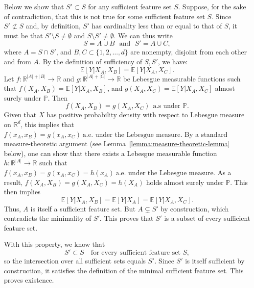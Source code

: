 \documentclass[sn-mathphys-num]{sn-jnl}%
\numberwithin{equation}{section}
\newcommand{\redblock}[1]{{\color{black}#1}}
\newcommand{\R}{\mathbb{R}}
\newcommand{\E}{\mathbb{E}}
\renewcommand{\P}{\mathbb{P}}
\theoremstyle{thmstyleone}%
\theoremstyle{thmstyletwo}%
\theoremstyle{thmstylethree}%
\begin{document}
Below we show that $S' \subset S$ for any sufficient feature set $S$. Suppose, for the sake of contradiction, that this is not true for some sufficient feature set $S$. Since $S' \not\subset S$ and, by definition, $S'$ has cardinality less than or equal to that of $S$, it must be that $S' \setminus S \neq \emptyset$ and $S \setminus S' \neq \emptyset$. We can thus write 
\begin{equation*}
	S = A \cup B~~~\text{and}~~~S' = A\cup C,
\end{equation*}
where $A = S \cap S'$, and $B, C \subset \{1, 2, \ldots, d\}$ are nonempty, disjoint from each other and from $A$.
By the definition of sufficiency of $S, S'$, we have:
\begin{equation*}
	\E[Y|X_A, X_B] =  \E[Y|X_A, X_C].
\end{equation*}
\redblock{
Let $f:\mathbb{R}^{|A|+|B|} \to \mathbb{R}$ and $g:\mathbb{R}^{|A|+|C|} \to \mathbb{R}$ be Lebesgue measurable functions such that
$f(X_A, X_B) = \E[Y | X_A, X_B]$, and 
$g(X_A, X_C) = \E[Y | X_A, X_C]$ almost surely under $\P$.  
Then 
\begin{equation*}
	f(X_A,X_B)=g(X_A,X_C)~~\text{a.s under $\P$}.
\end{equation*}
Given that $X$ has positive probability density with respect to Lebesgue measure on $\R^d$, this implies that 
$f(x_A, x_B) = g(x_A, x_C) ~\text{a.e. under the Lebesgue measure}$. 
By a standard measure-theoretic argument (see Lemma~\ref{lemma:measure-theoretic-lemma} below), one can show that
there exists a Lebesgue measurable function 
$h:\mathbb{R}^{|A|} \to \mathbb{R}$ such that 
$
f(x_A,x_B) = g(x_A,x_C) = h(x_A) ~\text{a.e. under the Lebesgue measure}.
$
As a result, $f(X_A, X_B) = g(X_A,X_C) = h(X_A)$ holds almost surely under $\P$. This then implies 
\begin{equation*}
	\E[Y|X_A, X_B] = \E[Y|X_A] = \E[Y|X_A, X_C].
\end{equation*}
Thus, $A$ is itself a sufficient feature set. But $A \subsetneq S'$ by construction, which contradicts the minimality of $S'$. This proves that $S'$ is a subset of every sufficient feature set.}

With this property, we know that 
\[
S' \subset S \quad \text{for every sufficient feature set } S,
\]
so the intersection over all sufficient sets equals $S'$. Since $S'$ is itself sufficient by construction, it satisfies the definition of the minimal sufficient feature set. This proves existence.

\vspace{.5em} 
\end{document}
